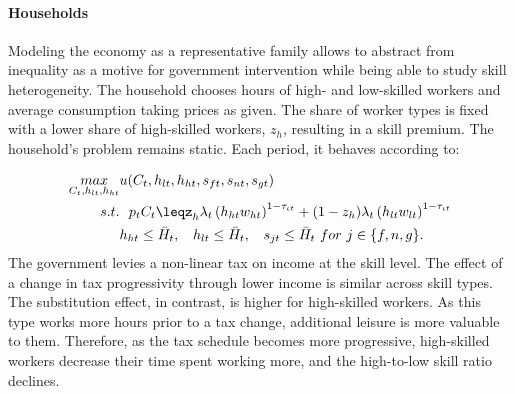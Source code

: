 \paragraph{Households}
Modeling the economy as a representative family allows to abstract from inequality as a motive for government intervention while being able to study skill heterogeneity.
 The household chooses hours of high- and low-skilled workers and average consumption taking prices as given. The share of worker types is fixed with a lower share of high-skilled workers, $z_h$, resulting in a skill premium. The household's problem remains static. Each period, it behaves according to: %

\begin{align}
\underset{C_{t}, h_{lt}, h_{ht}}{max}&
u(C_{t}, h_{lt}, h_{ht}, s_{ft}, s_{nt}, s_{gt})\\
s.t.& \ \ p_{t}C_{t}\leq%
z_h\lambda_t \left(h_{ht}w_{ht}\right)^{1-\tau_{\iota t}}+(1-z_h)\lambda_t\left(h_{lt}w_{lt}\right)^{1-\tau_{\iota t}}\\ %
\ & h_{ht}\leq \bar{H}_t,\ \hspace{2mm} h_{lt}\leq \bar{H}_t,\ \hspace{2mm}  s_{jt}\leq \bar{H}_t \ for\ j\in\{f,n,g\}.
\end{align}
The government levies a non-linear tax on income at the skill level. 
The effect of a change in tax progressivity through lower income is similar across skill types. The substitution effect, in contrast, is higher for high-skilled workers. As this type works more hours prior to a tax change, additional leisure is more valuable to them. Therefore, as the tax schedule becomes more progressive, high-skilled workers decrease their time spent working more, and the high-to-low skill ratio declines. 



